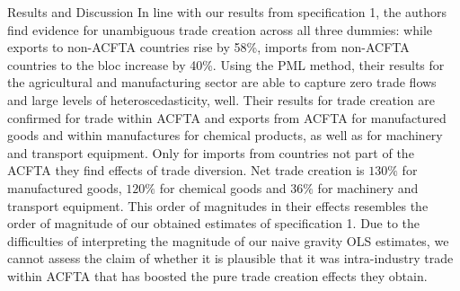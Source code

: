 \begin{section}{Results and Discussion}
In line with our results from specification 1, the authors find evidence for unambiguous trade creation across all three dummies: while exports to non-ACFTA countries rise by 58\%, imports from non-ACFTA countries to the bloc increase by 40\%. Using the PML method, their results for the agricultural and manufacturing sector are able to capture zero trade flows and large levels of heteroscedasticity, well. Their results for trade creation are confirmed for trade within ACFTA and exports from ACFTA for manufactured goods and within manufactures for chemical products, as well as for machinery and transport equipment. Only for imports from countries not part of the ACFTA they find effects of trade diversion. Net trade creation is $130\%$ for manufactured goods, $120\%$ for chemical goods and $36\%$ for machinery and transport equipment. This order of magnitudes in their effects resembles the order of magnitude of our obtained estimates of specification 1. Due to the difficulties of interpreting the magnitude of our naive gravity OLS estimates, we cannot assess the claim of \cite{wla_2021} whether it is plausible that it was intra-industry trade within ACFTA that has boosted the pure trade creation effects they obtain.

\end{section}
